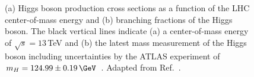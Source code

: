 \begin{figure}[h]
  \begin{center}
  \end{center}
  \caption[Higgs boson production cross sections and decay branching fractions.]{(a) Higgs boson production cross sections as a function of the LHC center-of-mass energy and (b) branching fractions of the Higgs boson. The black vertical lines indicate (a) a center-of-mass energy of $\sqrt{s} = 13\,$TeV and (b) the latest mass measurement of the Higgs boson including uncertainties by the ATLAS experiment of $m_H = 124.99 \pm 0.19\,\GeV$~\cite{https://doi.org/10.48550/arxiv.2207.00320}. Adapted from Ref.~\cite{deFlorian:2016spz}.}
\end{figure}

